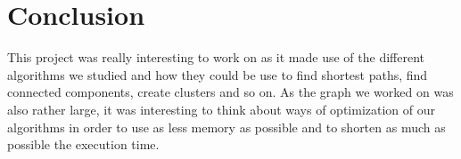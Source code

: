 \documentclass{article}
\begin{document}
\section{Conclusion}

This project was really interesting to work on as it made use of the different algorithms we studied and how they could be use to find shortest paths, find connected components, create clusters and so on. As the graph we worked on was also rather large, it was interesting to think about ways of optimization of our algorithms in order to use as less memory as possible and to shorten as much as possible the execution time.

\newpage

\thispagestyle{empty}
\listoffigures
\end{document}
